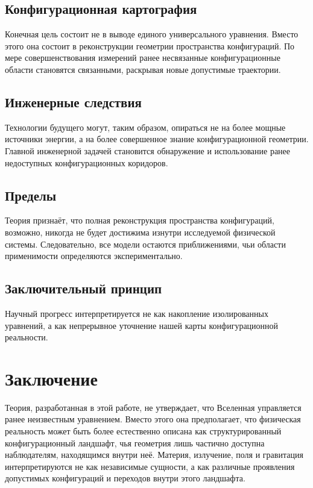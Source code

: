 \section{Конфигурационная картография}

Конечная цель состоит не в выводе единого универсального уравнения. Вместо этого она состоит в реконструкции геометрии пространства конфигураций. По мере совершенствования измерений ранее несвязанные конфигурационные области становятся связанными, раскрывая новые допустимые траектории.

\section{Инженерные следствия}

Технологии будущего могут, таким образом, опираться не на более мощные источники энергии, а на более совершенное знание конфигурационной геометрии. Главной инженерной задачей становится обнаружение и использование ранее недоступных конфигурационных коридоров.

\section{Пределы}

Теория признаёт, что полная реконструкция пространства конфигураций, возможно, никогда не будет достижима изнутри исследуемой физической системы. Следовательно, все модели остаются приближениями, чьи области применимости определяются экспериментально.

\section{Заключительный принцип}

Научный прогресс интерпретируется не как накопление изолированных уравнений, а как непрерывное уточнение нашей карты конфигурационной реальности.

\chapter*{Заключение}

Теория, разработанная в этой работе, не утверждает, что Вселенная управляется ранее неизвестным уравнением. Вместо этого она предполагает, что физическая реальность может быть более естественно описана как структурированный конфигурационный ландшафт, чья геометрия лишь частично доступна наблюдателям, находящимся внутри неё. Материя, излучение, поля и гравитация интерпретируются не как независимые сущности, а как различные проявления допустимых конфигураций и переходов внутри этого ландшафта.

